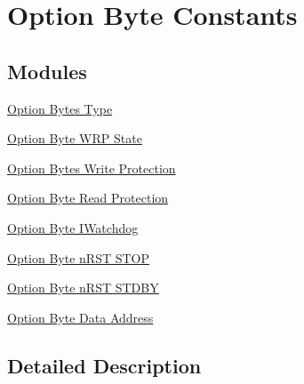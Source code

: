 \hypertarget{group___f_l_a_s_h_ex___option_byte___constants}{}\section{Option Byte Constants}
\label{group___f_l_a_s_h_ex___option_byte___constants}
\subsection*{Modules}
\begin{DoxyCompactItemize}
\item 
\hyperlink{group___f_l_a_s_h_ex___o_b___type}{Option Bytes Type}
\item 
\hyperlink{group___f_l_a_s_h_ex___o_b___w_r_p___state}{Option Byte W\+R\+P State}
\item 
\hyperlink{group___f_l_a_s_h_ex___o_b___write___protection}{Option Bytes Write Protection}
\item 
\hyperlink{group___f_l_a_s_h_ex___o_b___read___protection}{Option Byte Read Protection}
\item 
\hyperlink{group___f_l_a_s_h_ex___o_b___i_watchdog}{Option Byte I\+Watchdog}
\item 
\hyperlink{group___f_l_a_s_h_ex___o_b__n_r_s_t___s_t_o_p}{Option Byte n\+R\+S\+T S\+T\+OP}
\item 
\hyperlink{group___f_l_a_s_h_ex___o_b__n_r_s_t___s_t_d_b_y}{Option Byte n\+R\+S\+T S\+T\+D\+BY}
\item 
\hyperlink{group___f_l_a_s_h_ex___o_b___data___address}{Option Byte Data Address}
\end{DoxyCompactItemize}


\subsection{Detailed Description}
